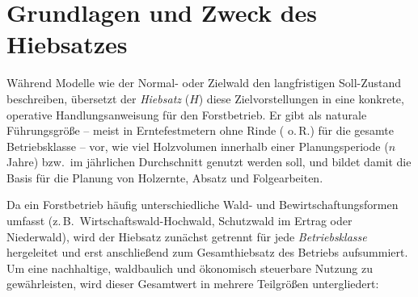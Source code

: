 \documentclass[twocolumn, paper=a4, fontsize=10pt]{scrartcl}
\begin{document}
\section{Grundlagen und Zweck des Hiebsatzes}

Während Modelle wie der Normal- oder Zielwald den langfristigen Soll-Zustand beschreiben, übersetzt der \emph{Hiebsatz} ($H$) diese Zielvorstellungen in eine konkrete, operative Handlungsanweisung für den Forstbetrieb. Er gibt als naturale Führungsgröße -- meist in Erntefestmetern ohne Rinde (\si{\Efm} o.\,R.) für die gesamte Betriebsklasse -- vor, wie viel Holzvolumen innerhalb einer Planungsperiode ($n$ Jahre) bzw.\ im jährlichen Durchschnitt genutzt werden soll, und bildet damit die Basis für die Planung von Holzernte, Absatz und Folgearbeiten.

Da ein Forstbetrieb häufig unterschiedliche Wald- und Bewirtschaftungsformen umfasst (z.\,B.\ Wirtschaftswald-Hochwald, Schutzwald im Ertrag oder Niederwald), wird der Hiebsatz zunächst getrennt für jede \emph{Betriebsklasse} hergeleitet und erst anschließend zum Gesamthiebsatz des Betriebs aufsummiert. Um eine nachhaltige, waldbaulich und ökonomisch steuerbare Nutzung zu gewährleisten, wird dieser Gesamtwert in mehrere Teilgrößen untergliedert:
\end{document}
